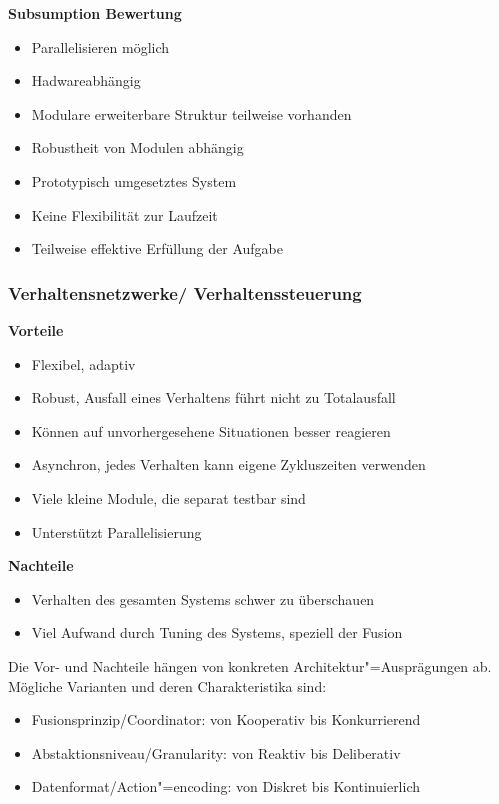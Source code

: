 \textbf{Subsumption Bewertung}
\begin{itemize}
	\item Parallelisieren möglich
	\item Hadwareabhängig
	\item Modulare erweiterbare Struktur teilweise vorhanden
	\item Robustheit von Modulen abhängig
	\item Prototypisch umgesetztes System
	\item Keine Flexibilität zur Laufzeit
	\item Teilweise effektive Erfüllung der Aufgabe
\end{itemize}

\subsubsection{Verhaltensnetzwerke/ Verhaltenssteuerung}
\textbf{Vorteile}
\begin{itemize}
	\item Flexibel, adaptiv
	\item Robust, Ausfall eines Verhaltens führt nicht zu Totalausfall
	\item Können auf unvorhergesehene Situationen besser reagieren
	\item Asynchron, jedes Verhalten kann eigene Zykluszeiten verwenden
	\item Viele kleine Module, die separat testbar sind
	\item Unterstützt Parallelisierung
\end{itemize}
\textbf{Nachteile}
\begin{itemize}
	\item Verhalten des gesamten Systems schwer zu überschauen 
	\item Viel Aufwand durch Tuning des Systems, speziell der Fusion
\end{itemize}
Die Vor- und Nachteile hängen von konkreten Architektur"=Ausprägungen ab. Mögliche Varianten und deren Charakteristika sind:
\begin{itemize}
	\item Fusionsprinzip/Coordinator: von Kooperativ bis Konkurrierend
	\item Abstaktionsniveau/Granularity: von Reaktiv bis Deliberativ
	\item Datenformat/Action"=encoding: von Diskret bis Kontinuierlich
\end{itemize}

